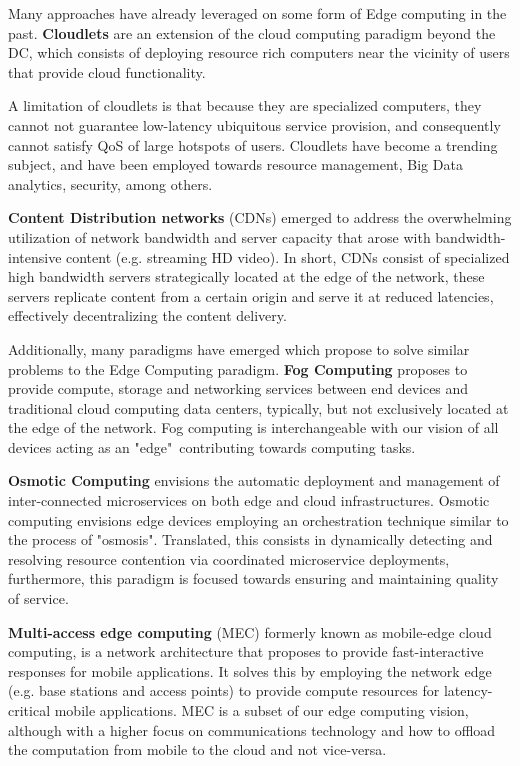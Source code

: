 Many approaches have already leveraged on some form of Edge computing in the past. \textbf{Cloudlets} \cite{10.1145/2307849.2307858} are an extension of the cloud computing paradigm beyond the DC, which consists of deploying resource rich computers near the vicinity of users that provide cloud functionality.

A limitation of cloudlets is that because they are specialized computers, they cannot not guarantee low-latency ubiquitous service provision, and consequently cannot satisfy QoS of large hotspots of users. Cloudlets have become a trending subject, and have been employed towards resource management, Big Data analytics, security, among others.

\textbf{Content Distribution networks} \cite{peng2004cdn} (CDNs) emerged to address the overwhelming utilization of network bandwidth and server capacity that arose with bandwidth-intensive content (e.g. streaming HD video). In short, CDNs consist of specialized high bandwidth servers strategically located at the edge of the network, these servers replicate content from a certain origin and serve it at reduced latencies, effectively decentralizing the content delivery. 

Additionally, many paradigms have emerged which propose to solve similar problems to the Edge Computing paradigm. \textbf{Fog Computing} \cite{bonomi2012fog} proposes to provide compute, storage and networking services between end devices and traditional cloud computing data centers, typically, but not exclusively located at the edge of the network. Fog computing is interchangeable with our vision of all devices acting as an "edge"\ contributing towards computing tasks.

\textbf{Osmotic Computing} \cite{villari2016osmotic} envisions the automatic deployment and management of inter-connected microservices on both edge and cloud infrastructures. Osmotic computing envisions edge devices employing an orchestration technique similar to the process of "osmosis". Translated, this consists in dynamically detecting and resolving resource contention via coordinated microservice deployments, furthermore, this paradigm is focused towards ensuring and maintaining quality of service.

\textbf{Multi-access edge computing} \cite{mobile_edge_cloud} (MEC) formerly known as mobile-edge cloud computing, is a network architecture that proposes to provide fast-interactive responses for mobile applications. It solves this by employing the network edge (e.g. base stations and access points) to provide compute resources for latency-critical mobile applications. MEC is a subset of our edge computing vision, although with a higher focus on communications technology and how to offload the computation from mobile to the cloud and not vice-versa. 

